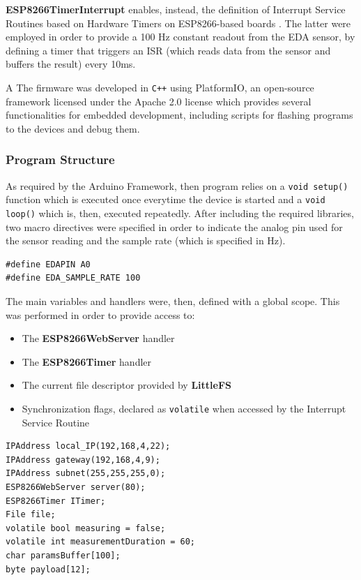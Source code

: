 \vspace{8mm}

\textbf{ESP8266TimerInterrupt} enables, instead, the definition of Interrupt Service Routines based on Hardware Timers on ESP8266-based boards \cite{esp8266timerinterrupt}. The latter were employed in order to provide a 100 Hz constant readout from the EDA sensor, by defining a timer that triggers an ISR (which reads data from the sensor and buffers the result) every 10ms.

\vspace{8mm}
A
The firmware was developed in \texttt{C++} using PlatformIO, an open-source framework licensed under the Apache 2.0 license \cite{platformio} which provides several functionalities for embedded development, including scripts for flashing programs to the devices and debug them.

\subsubsection{Program Structure}\label{subsubsec:program-structure}

As required by the Arduino Framework, then program relies on a \texttt{void setup()} function which is executed once everytime the device is started and a \texttt{void loop()} which is, then, executed repeatedly. After including the required libraries, two macro directives were specified in order to indicate the analog pin used for the sensor reading and the sample rate (which is specified in Hz).

\begin{verbatim}
#define EDAPIN A0
#define EDA_SAMPLE_RATE 100
\end{verbatim}

The main variables and handlers were, then, defined with a global scope. This was performed in order to provide access to:

\begin{itemize}
    \item The \textbf{ESP8266WebServer} handler
    \item The \textbf{ESP8266Timer} handler
    \item The current file descriptor provided by \textbf{LittleFS}
    \item Synchronization flags, declared as \texttt{volatile} when accessed by the Interrupt Service Routine
\end{itemize}

\begin{verbatim}
IPAddress local_IP(192,168,4,22);
IPAddress gateway(192,168,4,9);
IPAddress subnet(255,255,255,0);
ESP8266WebServer server(80);
ESP8266Timer ITimer;
File file;
volatile bool measuring = false;
volatile int measurementDuration = 60;
char paramsBuffer[100];
byte payload[12];
\end{verbatim}

